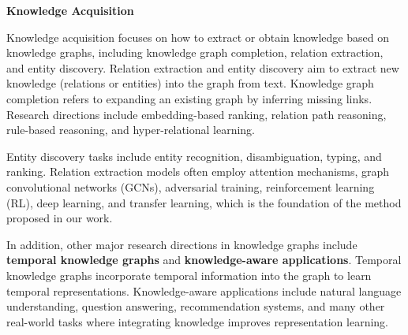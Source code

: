 \textbf{Knowledge Acquisition}

Knowledge acquisition focuses on how to extract or obtain knowledge based on knowledge graphs, including knowledge graph completion, relation extraction, and entity discovery. Relation extraction and entity discovery aim to extract new knowledge (relations or entities) into the graph from text. Knowledge graph completion refers to expanding an existing graph by inferring missing links. Research directions include embedding-based ranking, relation path reasoning, rule-based reasoning, and hyper-relational learning.

Entity discovery tasks include entity recognition, disambiguation, typing, and ranking. Relation extraction models often employ attention mechanisms, graph convolutional networks (GCNs), adversarial training, reinforcement learning (RL), deep learning, and transfer learning, which is the foundation of the method proposed in our work.

In addition, other major research directions in knowledge graphs include \textbf{temporal knowledge graphs} and \textbf{knowledge-aware applications}. Temporal knowledge graphs incorporate temporal information into the graph to learn temporal representations. Knowledge-aware applications include natural language understanding, question answering, recommendation systems, and many other real-world tasks where integrating knowledge improves representation learning.
